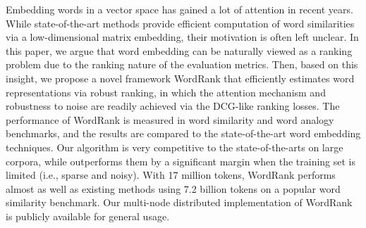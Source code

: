 Embedding words in a vector space has gained a lot of attention in recent years. While state-of-the-art methods provide efficient computation of word similarities via a low-dimensional matrix embedding, their motivation is often left unclear. In this paper, we argue that word embedding can be naturally viewed as a ranking problem due to the ranking nature of the evaluation metrics. Then, based on this insight, we propose a novel framework WordRank that efficiently estimates word representations via robust ranking, in which the attention mechanism and robustness to noise are readily achieved via the DCG-like ranking losses. The performance of WordRank is measured in word similarity and word analogy benchmarks, and the results are compared to the state-of-the-art word embedding techniques. Our algorithm is very competitive to the state-of-the-arts on large corpora, while outperforms them by a significant margin when the training set is limited (i.e., sparse and noisy). With 17 million tokens, WordRank performs almost as well as existing methods using 7.2 billion tokens on a popular word similarity benchmark. Our multi-node distributed implementation of WordRank is publicly available for general usage.
